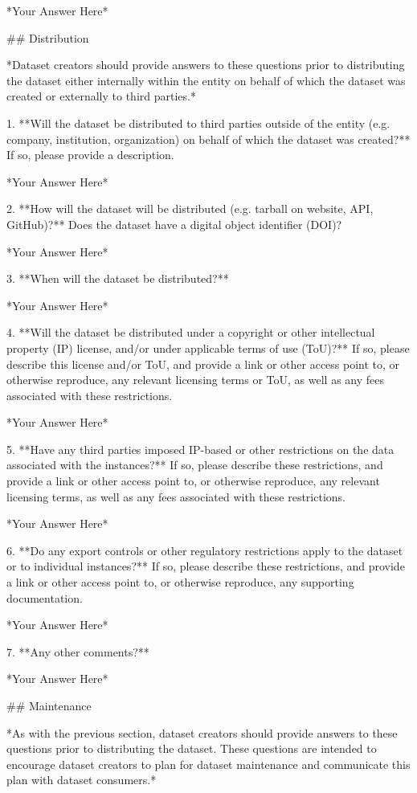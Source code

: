 	*Your Answer Here*


## Distribution

*Dataset creators should provide answers to these questions prior to distributing the dataset either internally within the entity on behalf of which the dataset was created or externally to third parties.*

1. **Will the dataset be distributed to third parties outside of the entity (e.g. company, institution, organization) on behalf of which the dataset was created?** If so, please provide a description.

	*Your Answer Here*

2. **How will the dataset will be distributed (e.g. tarball on website, API, GitHub)?** Does the dataset have a digital object identifier (DOI)?

	*Your Answer Here*

3. **When will the dataset be distributed?**

	*Your Answer Here*

4. **Will the dataset be distributed under a copyright or other intellectual property (IP) license, and/or under applicable terms of use (ToU)?** If so, please describe this license and/or ToU, and provide a link or other access point to, or otherwise reproduce, any relevant licensing terms or ToU, as well as any fees associated with these restrictions.

	*Your Answer Here*

5. **Have any third parties imposed IP-based or other restrictions on the data associated with the instances?** If so, please describe these restrictions, and provide a link or other access point to, or otherwise reproduce, any relevant licensing terms, as well as any fees associated with these restrictions.

	*Your Answer Here*

6. **Do any export controls or other regulatory restrictions apply to the dataset or to individual instances?** If so, please describe these restrictions, and provide a link or other access point to, or otherwise reproduce, any supporting documentation.

	*Your Answer Here*

7. **Any other comments?**

	*Your Answer Here*


## Maintenance

*As with the previous section, dataset creators should provide answers to these questions prior to distributing the dataset. These questions are intended to encourage dataset creators to plan for dataset maintenance and communicate this plan with dataset consumers.*

